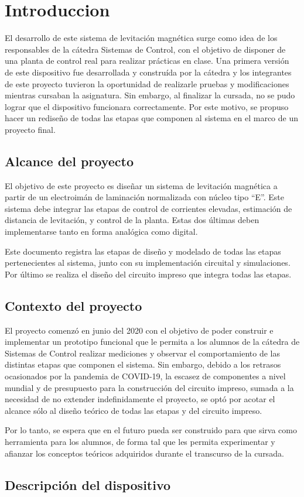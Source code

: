\chapter{Introduccion}  \label{cap:Introducción}

\noindent El desarrollo de este sistema de levitación magnética surge como idea de los responsables de la cátedra Sistemas de Control, con el objetivo de disponer de una planta de control real para realizar prácticas en clase. Una primera versión de este dispositivo fue desarrollada y construída por la cátedra y los integrantes de este proyecto tuvieron la oportunidad de realizarle pruebas y modificaciones mientras cursaban la asignatura. Sin embargo, al finalizar la cursada, no se pudo lograr que el dispositivo funcionara correctamente. Por este motivo,  se propuso hacer un rediseño de todas las etapas que componen al sistema en el marco de un proyecto final.


\section{Alcance del proyecto}

\noindent El objetivo de este proyecto es diseñar un sistema de levitación magnética a partir de un electroimán de laminación normalizada con núcleo tipo “E''. Este sistema debe integrar las etapas de control de corrientes elevadas, estimación de distancia de levitación, y control de la planta. Estas dos últimas deben implementarse tanto en forma analógica como digital.

\noindent Este documento registra las etapas de diseño y modelado de todas las etapas pertenecientes al sistema, junto con su implementación circuital y simulaciones. Por último se realiza el diseño del circuito impreso que integra todas las etapas.


\section{Contexto del proyecto}

\noindent El proyecto comenzó en junio del 2020 con el objetivo de poder construir e implementar un prototipo funcional que le permita a los alumnos de la cátedra de Sistemas de Control realizar mediciones y observar el comportamiento de las distintas etapas que componen el sistema. Sin embargo, debido a los retrasos ocasionados por la pandemia de COVID-19,  la escasez de componentes a nivel mundial y de presupuesto para la construcción del circuito impreso, sumada a la  necesidad de no extender indefinidamente el proyecto, se optó por acotar el alcance sólo al diseño teórico de todas las etapas y del circuito impreso.

\noindent Por lo tanto, se espera que en el futuro pueda ser construido para que sirva como herramienta para los alumnos, de forma tal que les permita experimentar y afianzar los conceptos teóricos adquiridos durante el transcurso de la cursada.



\section{Descripción del dispositivo}